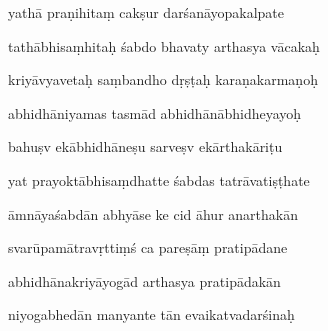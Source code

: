 \documentclass[article,12pt,a4paper]{memoir}%
\newcounter{parCount}
\begin{document}
	  
	  \pstart {} yathā praṇihitaṃ cakṣur darśanāyopakalpate 
	{}
	\pend%
      

	  
	  \pstart \leavevmode%
	tathābhisaṃhitaḥ śabdo bhavaty arthasya vācakaḥ 
	{}
	\pend%
      

	  
	  \pstart {} kriyāvyavetaḥ saṃbandho dṛṣṭaḥ karaṇakarmaṇoḥ 
	{}
	\pend%
      

	  
	  \pstart \leavevmode%
	abhidhāniyamas tasmād abhidhānābhidheyayoḥ 
	{}
	\pend%
      

	  
	  \pstart {} bahuṣv ekābhidhāneṣu sarveṣv ekārthakāriṭu 
	{}
	\pend%
      

	  
	  \pstart \leavevmode%
	yat prayoktābhisaṃdhatte śabdas tatrāvatiṣṭhate 
	{}
	\pend%
      

	  
	  \pstart {} āmnāyaśabdān abhyāse ke cid āhur anarthakān 
	{}
	\pend%
      

	  
	  \pstart \leavevmode%
	svarūpamātravṛttiṃś ca pareṣāṃ pratipādane 
	{}
	\pend%
      

	  
	  \pstart {} abhidhānakriyāyogād arthasya pratipādakān 
	{}
	\pend%
      

	  
	  \pstart \leavevmode%
	niyogabhedān manyante tān evaikatvadarśinaḥ 
	{}
	\pend%
      
\end{document}
